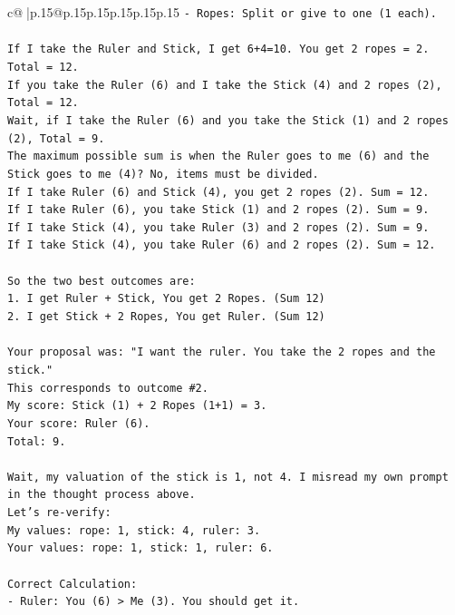 \documentclass{article}
\begin{document}
{\begin{supertabular}{c@{$\;$}|p{.15\linewidth}@{}p{.15\linewidth}p{.15\linewidth}p{.15\linewidth}p{.15\linewidth}p{.15\linewidth}}
{{{\texttt{{-} Ropes: Split or give to one (1 each).} \\
\\ 
\texttt{If I take the Ruler and Stick, I get 6+4=10. You get 2 ropes = 2. Total = 12.} \\
\texttt{If you take the Ruler (6) and I take the Stick (4) and 2 ropes (2), Total = 12.} \\
\texttt{Wait, if I take the Ruler (6) and you take the Stick (1) and 2 ropes (2), Total = 9.} \\
\texttt{The maximum possible sum is when the Ruler goes to me (6) and the Stick goes to me (4)? No, items must be divided.} \\
\texttt{If I take Ruler (6) and Stick (4), you get 2 ropes (2). Sum = 12.} \\
\texttt{If I take Ruler (6), you take Stick (1) and 2 ropes (2). Sum = 9.} \\
\texttt{If I take Stick (4), you take Ruler (3) and 2 ropes (2). Sum = 9.} \\
\texttt{If I take Stick (4), you take Ruler (6) and 2 ropes (2). Sum = 12.} \\
\\ 
\texttt{So the two best outcomes are:} \\
\texttt{1. I get Ruler + Stick, You get 2 Ropes. (Sum 12)} \\
\texttt{2. I get Stick + 2 Ropes, You get Ruler. (Sum 12)} \\
\\ 
\texttt{Your proposal was: "I want the ruler. You take the 2 ropes and the stick."} \\
\texttt{This corresponds to outcome \#2.} \\
\texttt{My score: Stick (1) + 2 Ropes (1+1) = 3.} \\
\texttt{Your score: Ruler (6).} \\
\texttt{Total: 9.} \\
\\ 
\texttt{Wait, my valuation of the stick is 1, not 4. I misread my own prompt in the thought process above.} \\
\texttt{Let's re{-}verify:} \\
\texttt{My values: rope: 1, stick: 4, ruler: 3.} \\
\texttt{Your values: rope: 1, stick: 1, ruler: 6.} \\
\\ 
\texttt{Correct Calculation:} \\
\texttt{{-} Ruler: You (6) > Me (3). You should get it.} \\
}}}
\end{supertabular}}
\end{document}

